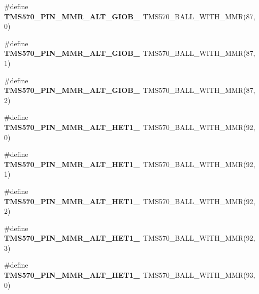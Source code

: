 \begin{DoxyCompactItemize}
\#define {\bfseries T\+M\+S570\+\_\+\+P\+I\+N\+\_\+\+M\+M\+R\+\_\+\+A\+L\+T\+\_\+\+G\+I\+O\+B\+\_}~T\+M\+S570\+\_\+\+B\+A\+L\+L\+\_\+\+W\+I\+T\+H\+\_\+\+M\+MR(87, 0)
\item 
\mbox{\label{tms570lc4357-pins_8h_a2bbc56915e22fc0e2ad368d08e19b625}} 
\#define {\bfseries T\+M\+S570\+\_\+\+P\+I\+N\+\_\+\+M\+M\+R\+\_\+\+A\+L\+T\+\_\+\+G\+I\+O\+B\+\_}~T\+M\+S570\+\_\+\+B\+A\+L\+L\+\_\+\+W\+I\+T\+H\+\_\+\+M\+MR(87, 1)
\item 
\mbox{\label{tms570lc4357-pins_8h_ac38b08e829a72af2a7af038ab04c7570}} 
\#define {\bfseries T\+M\+S570\+\_\+\+P\+I\+N\+\_\+\+M\+M\+R\+\_\+\+A\+L\+T\+\_\+\+G\+I\+O\+B\+\_}~T\+M\+S570\+\_\+\+B\+A\+L\+L\+\_\+\+W\+I\+T\+H\+\_\+\+M\+MR(87, 2)
\item 
\mbox{\label{tms570lc4357-pins_8h_a4639a76fa7c7303fa4582da38b499908}} 
\#define {\bfseries T\+M\+S570\+\_\+\+P\+I\+N\+\_\+\+M\+M\+R\+\_\+\+A\+L\+T\+\_\+\+H\+E\+T1\+\_}~T\+M\+S570\+\_\+\+B\+A\+L\+L\+\_\+\+W\+I\+T\+H\+\_\+\+M\+MR(92, 0)
\item 
\mbox{\label{tms570lc4357-pins_8h_ab4d6ee63d1f338d394f229078f2fec3a}} 
\#define {\bfseries T\+M\+S570\+\_\+\+P\+I\+N\+\_\+\+M\+M\+R\+\_\+\+A\+L\+T\+\_\+\+H\+E\+T1\+\_}~T\+M\+S570\+\_\+\+B\+A\+L\+L\+\_\+\+W\+I\+T\+H\+\_\+\+M\+MR(92, 1)
\item 
\mbox{\label{tms570lc4357-pins_8h_a26f0cfc934d0cc9c754b67aa823a0ee2}} 
\#define {\bfseries T\+M\+S570\+\_\+\+P\+I\+N\+\_\+\+M\+M\+R\+\_\+\+A\+L\+T\+\_\+\+H\+E\+T1\+\_}~T\+M\+S570\+\_\+\+B\+A\+L\+L\+\_\+\+W\+I\+T\+H\+\_\+\+M\+MR(92, 2)
\item 
\mbox{\label{tms570lc4357-pins_8h_af6ae9d3d6afa8810ae68ac7c0b3c5938}} 
\#define {\bfseries T\+M\+S570\+\_\+\+P\+I\+N\+\_\+\+M\+M\+R\+\_\+\+A\+L\+T\+\_\+\+H\+E\+T1\+\_}~T\+M\+S570\+\_\+\+B\+A\+L\+L\+\_\+\+W\+I\+T\+H\+\_\+\+M\+MR(92, 3)
\item 
\mbox{\label{tms570lc4357-pins_8h_a1c159cf20cf5991577a5ba3ed846f7e4}} 
\#define {\bfseries T\+M\+S570\+\_\+\+P\+I\+N\+\_\+\+M\+M\+R\+\_\+\+A\+L\+T\+\_\+\+H\+E\+T1\+\_}~T\+M\+S570\+\_\+\+B\+A\+L\+L\+\_\+\+W\+I\+T\+H\+\_\+\+M\+MR(93, 0)

\end{DoxyCompactItemize}
